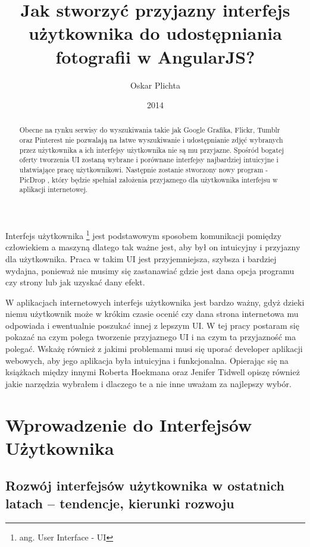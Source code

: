 \documentclass[brudnopis]{xmgr}
\author   {Oskar Plichta}
\title    {Jak stworzyć przyjazny interfejs użytkownika do udostępniania fotografii w AngularJS? }
\date     {2014}
\begin{document}
\begin{abstract}
 Obecne na rynku serwisy do wyszukiwania takie jak Google Grafika, Flickr, Tumblr oraz Pinterest nie pozwalają na łatwe wyszukiwanie i udostępnianie zdjęć wybranych przez użytkownika a ich interfejsy użytkownika nie są mu przyjazne. Spośród bogatej oferty tworzenia UI zostaną wybrane i porównane interfejsy najbardziej intuicyjne i ułatwiające pracę użytkownikowi. Następnie zostanie stworzony nowy program - PicDrop , który będzie spełniał założenia przyjaznego dla użytkownika interfejsu w aplikacji internetowej.
\end{abstract}

\maketitle
%
\introduction

Interfejs użytkownika \footnote{ang. User Interface - UI}  jest podstawowym sposobem komunikacji pomiędzy człowiekiem a maszyną dlatego tak ważne jest, aby był on intuicyjny i przyjazny dla użytkownika. Praca w takim UI jest przyjemniejsza, szybsza i bardziej wydajna, ponieważ nie musimy się zastanawiać gdzie jest dana opcja programu czy strony lub jak uzyskać dany efekt. 

W aplikacjach internetowych interfejs użytkownika jest bardzo ważny, gdyż dzieki niemu użytkownik może w krókim czasie ocenić czy dana strona internetowa mu odpowiada i ewentualnie poszukać innej z lepszym UI. 
W tej pracy postaram się pokazać na czym polega tworzenie przyjaznego UI i na czym ta przyjazność ma polegać.
Wskażę również z jakimi problemami musi się uporać developer aplikacji webowych, aby jego aplikacja była intuicyjna i funkcjonalna. Opierając się na książkach między innymi Roberta Hoekmana  \cite {magiaUI} oraz Jenifer Tidwell  \cite {projektowanieUI}  opiszę również jakie narzędzia wybrałem i dlaczego te a nie inne uważam za najlepszy wybór.


\chapter{Wprowadzenie do Interfejsów Użytkownika}

\section{Rozwój interfejsów użytkownika w ostatnich latach – tendencje, kierunki rozwoju}
\end{document}
